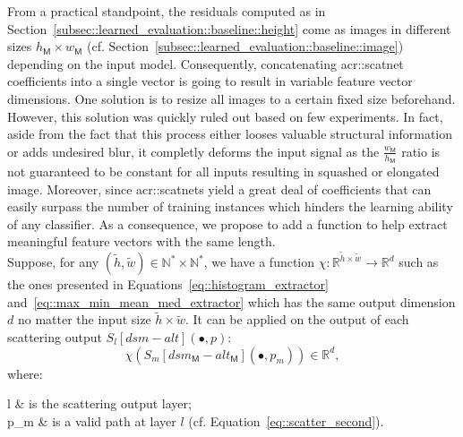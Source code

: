             From a practical standpoint, the residuals computed as in Section~\ref{subsec::learned_evaluation::baseline::height} come as images in different sizes \(h_{\mathsf{M}} \times w_{\mathsf{M}}\) (cf. Section~\ref{subsec::learned_evaluation::baseline::image}) depending on the input model.
            Consequently, concatenating \gls{acr::scatnet} coefficients into a single vector is going to result in variable feature vector dimensions.
            One solution is to resize all images to a certain fixed size beforehand.
            However, this solution was quickly ruled out based on few experiments.
            In fact, aside from the fact that this process either looses valuable structural information or adds undesired blur, it completly deforms the input signal as the \(\frac{w_{\mathsf{M}}}{h_{\mathsf{M}}}\) ratio is not guaranteed to be constant for all inputs resulting in squashed or elongated image.
            Moreover, since \glspl{acr::scatnet} yield a great deal of coefficients that can easily surpass the number of training instances which hinders the learning ability of any classifier.
            As a consequence, we propose to add a function to help extract meaningful feature vectors with the same length.\\

            Suppose, for any \((\tilde{h}, \tilde{w}) \in \mathbb{N}^* \times \mathbb{N}^*\),  we have a function \(\chi: \mathbb{R}^{\tilde{h} \times \tilde{w}} \rightarrow \mathbb{R}^d\) such as the ones presented in Equations~\ref{eq::histogram_extractor} and~\ref{eq::max_min_mean_med_extractor} which has the same output dimension \(d\) no matter the input size \(\tilde{h} \times \tilde{w}\).
            It can be applied on the output of each scattering output \(S_l[dsm - alt](\bullet, p)\):
            \begin{equation}
                \label{eq::reduced_scattering}
                \chi \left(S_m[dsm_{\mathsf{M}} - alt_{\mathsf{M}}]\left(\bullet, p_m\right)\right) \in \mathbb{R}^d,
            \end{equation}
            where:
            \begin{conditions}
                l & is the scattering output layer;\\
                p_m & is a valid path at layer \(l\) (cf. Equation~\ref{eq::scatter_second}). 
            \end{conditions}
            
